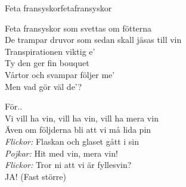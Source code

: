 \begin{song}{Feta fransyskor}{fetafransyskor}
\begin{vers}
Feta fransyskor som svettas om fötterna\\
De trampar druvor som sedan skall jäsas till vin\\
Transpirationen viktig e'\\
Ty den ger fin bouquet\\
Vårtor och svampar följer me'\\
Men vad gör väl de'?\\
\end{vers}
\begin{vers}
För..\\
Vi vill ha vin, vill ha vin, vill ha mera vin\\
Även om följderna bli att vi må lida pin\\
\textit{Flickor:} Flaskan och glaset gått i sin\\
\textit{Pojkar:} Hit med vin, mera vin!\\
\textit{Flickor:} Tror ni att vi är fyllesvin?\\
JA! (Fast större)\\
\end{vers}
\end{song}
